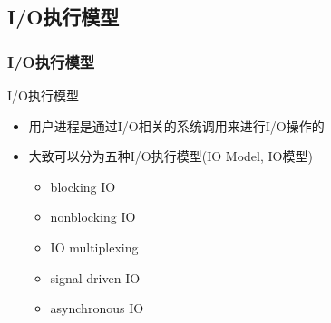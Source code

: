 \subsection{I/O执行模型} %
\begin{frame}[fragile]
    \frametitle{I/O执行模型}
    I/O执行模型
    \begin{itemize}
        \item 用户进程是通过I/O相关的系统调用来进行I/O操作的
        \item 大致可以分为五种I/O执行模型(IO Model, IO模型)
        \begin{itemize}
            \item blocking IO
            \item nonblocking IO
            \item IO multiplexing
            \item signal driven IO
            \item asynchronous IO
        \end{itemize}
    \end{itemize}
\end{frame}

